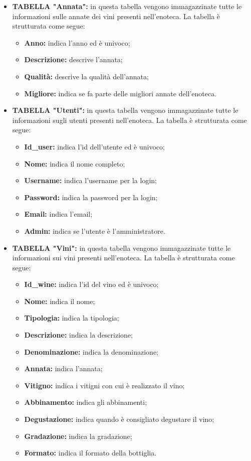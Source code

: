 \begin{itemize}
	\item \textbf{TABELLA "Annata":} in questa tabella vengono immagazzinate tutte le
	informazioni sulle annate dei vini presenti nell'enoteca. La tabella è strutturata come segue:
	\begin{itemize}
		\item \textbf{Anno:} indica l'anno ed è univoco;
		\item \textbf{Descrizione:} descrive l'annata;
		\item \textbf{Qualità:} descrive la qualità dell'annata;
		\item \textbf{Migliore:} indica se fa parte delle migliori annate dell'enoteca.
	\end{itemize}	
	\item \textbf{TABELLA "Utenti":} in questa tabella vengono immagazzinate tutte le informazioni sugli utenti presenti nell'enoteca. La tabella è strutturata come segue:
	\begin{itemize}
		\item \textbf{Id\_user:} indica l'id dell'utente ed è univoco;
		\item \textbf{Nome:} indica il nome completo;
		\item \textbf{Username:} indica l'username per la login;
		\item \textbf{Password:} indica la password per la login;
		\item \textbf{Email:} indica l'email;
		\item \textbf{Admin:} indica se l'utente è l'amministratore.
	\end{itemize}
	\item \textbf{TABELLA "Vini":} in questa tabella vengono immagazzinate tutte le informazioni sui vini presenti nell'enoteca. La tabella è strutturata come segue:
	\begin{itemize}
		\item \textbf{Id\_wine:} indica l'id del vino ed è univoco;
		\item \textbf{Nome:} indica il nome;
		\item \textbf{Tipologia:} indica la tipologia;
		\item \textbf{Descrizione:} indica la descrizione;
		\item \textbf{Denominazione:} indica la denominazione;
		\item \textbf{Annata:} indica l'annata;
		\item \textbf{Vitigno:} indica i vitigni con cui è realizzato il vino;
		\item \textbf{Abbinamento:} indica gli abbinamenti;
		\item \textbf{Degustazione:} indica quando è consigliato degustare il vino;
		\item \textbf{Gradazione:} indica la gradazione;
		\item \textbf{Formato:} indica il formato della bottiglia.
	\end{itemize}
\end{itemize}

